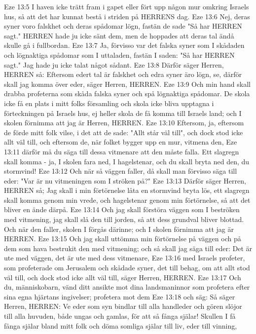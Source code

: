 Eze 13:5  I haven icke trätt fram i gapet eller fört upp någon mur omkring Israels hus, så att det har kunnat bestå i striden på HERRENS dag.
Eze 13:6  Nej, deras syner voro falskhet och deras spådomar lögn, fastän de sade "Så har HERREN sagt." HERREN hade ju icke sänt dem, men de hoppades att deras tal ändå skulle gå i fullbordan.
Eze 13:7  Ja, förvisso var det falska syner som I skådaden och lögnaktiga spådomar som I uttaladen, fastän I saden: "Så har HERREN sagt." Jag hade ju icke talat något sådant.
Eze 13:8  Därför säger Herren, HERREN så: Eftersom edert tal är falskhet och edra syner äro lögn, se, därför skall jag komma över eder, säger Herren, HERREN.
Eze 13:9  Och min hand skall drabba profeterna som skåda falska syner och spå lögnaktiga spådomar. De skola icke få en plats i mitt folks församling och skola icke bliva upptagna i förteckningen på Israels hus, ej heller skola de få komma till Israels land; och I skolen förnimma att jag är Herren, HERREN.
Eze 13:10  Eftersom, ja, eftersom de förde mitt folk vilse, i det att de sade: "Allt står väl till", och dock stod icke allt väl till, och eftersom de, när folket bygger upp en mur, vitmena den,
Eze 13:11  därför må du säga till dessa vitmenare att den måste falla. Ett slagregn skall komma - ja, I skolen fara ned, I hagelstenar, och du skall bryta ned den, du stormvind!
Eze 13:12  Och när så väggen faller, då skall man förvisso säga till eder: "Var är nu vitmeningen som I ströken på?"
Eze 13:13  Därför säger Herren, HERREN så; Jag skall i min förtörnelse låta en stormvind bryta lös, ett slagregn skall komma genom min vrede, och hagelstenar genom min förtörnelse, så att det bliver en ände därpå.
Eze 13:14  Och jag skall förstöra väggen som I beströken med vitmening, jag skall slå den till jorden, så att dess grundval bliver blottad. Och när den faller, skolen I förgås därinne; och I skolen förnimma att jag är HERREN.
Eze 13:15  Och jag skall uttömma min förtörnelse på väggen och på dem som hava bestrukit den med vitmening; och så skall jag säga till eder: Det är ute med väggen, det är ute med dess vitmenare,
Eze 13:16  med Israels profeter, som profeterade om Jerusalem och skådade syner, det till behag, om att allt stod väl till, och dock stod icke allt väl till, säger Herren, HERREN.
Eze 13:17  Och du, människobarn, vänd ditt ansikte mot dina landsmaninnor som profetera efter sina egna hjärtans ingivelser; profetera mot dem
Eze 13:18  och säg: Så säger Herren, HERREN: Ve eder som syn bindlar till alla handleder och gören slöjor till alla huvuden, både ungas och gamlas, för att så fånga själar! Skullen I få fånga själar bland mitt folk och döma somliga själar till liv, eder till vinning,
